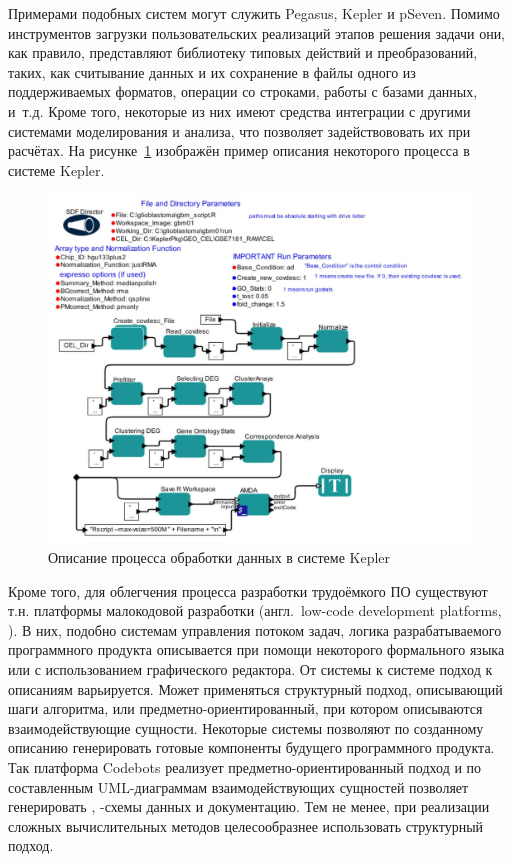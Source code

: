 Примерами подобных систем могут служить Pegasus\cite{DeelmanPegasus2016}, Kepler\cite{AltintasKepler2004} и pSeven\cite{NazarenkoDFM2015}. Помимо инструментов загрузки пользовательских реализаций этапов решения задачи они, как правило, представляют библиотеку типовых действий и преобразований, таких, как считывание данных и их сохранение в файлы одного из поддерживаемых форматов, операции со строками, работы с базами данных, и~т.д. Кроме того, некоторые из них имеют средства интеграции с другими системами моделирования и анализа, что позволяет задействововать их при расчётах. На рисунке~\ref{fig:intro.keplerScreenshot} изображён пример описания некоторого процесса в системе Kepler.
\begin{figure}[!ht]
  \centering
  \includegraphics[height=0.35\textheight]{figures/screenshot.KeplerWorkflow.jpg}
  \caption{Описание процесса обработки данных в системе Kepler}
  \label{fig:intro.keplerScreenshot}
\end{figure}

Кроме того, для облегчения процесса разработки трудоёмкого ПО существуют т.н. платформы малокодовой разработки (англ.~low-code development platforms, )\cite{DiRuscio2022}. В них, подобно системам управления потоком задач, логика разрабатываемого программного продукта описывается при помощи некоторого формального языка или с использованием графического редактора. От системы к системе подход к описаниям варьируется. Может применяться структурный подход, описывающий шаги алгоритма, или предметно-ориентированный, при котором описываются взаимодействующие сущности. Некоторые системы позволяют по созданному описанию генерировать готовые компоненты будущего программного продукта. Так платформа Codebots реализует предметно-ориентированный подход и по составленным UML-диаграммам взаимодействующих сущностей позволяет генерировать , -схемы данных и документацию\cite{DiRuscio2022}. Тем не менее, при реализации сложных вычислительных методов целесообразнее использовать структурный подход.

